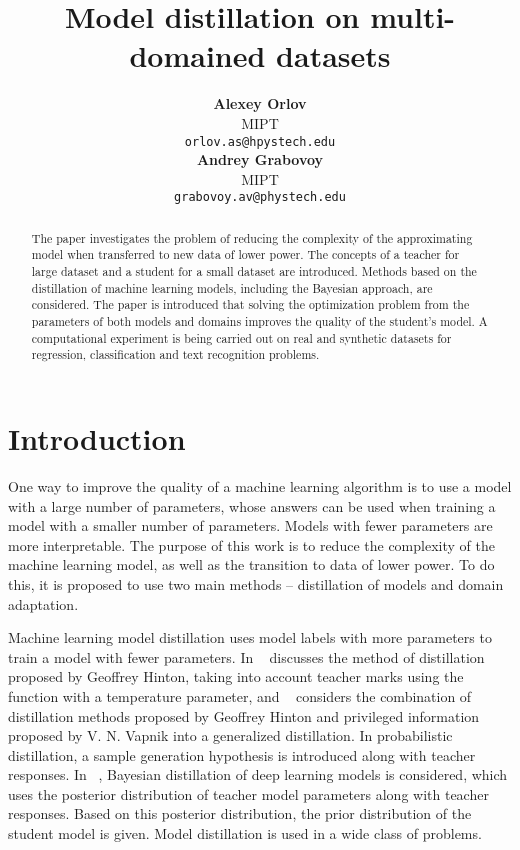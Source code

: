 \documentclass[12pt]{article}
\title{Model distillation on multi-domained datasets}
\author{ \textbf{Alexey Orlov}\\
	MIPT\\
        \texttt{orlov.as@hpystech.edu}\\
	\And
	\textbf{Andrey Grabovoy} \\
	MIPT\\
        \texttt{grabovoy.av@phystech.edu}\\
}
\date{}
\begin{document}
\maketitle

\begin{abstract}
	The paper investigates the problem of reducing the complexity of the approximating model when transferred to new data of lower power. The concepts of a teacher for large dataset and a student for a small dataset are introduced. Methods based on the distillation of machine learning models, including the Bayesian approach, are considered. The paper is introduced that solving the optimization problem from the parameters of both models and domains improves the quality of the student's model. A computational experiment is being carried out on real and synthetic datasets for regression, classification and text recognition problems.
\end{abstract}




\section{Introduction}

One way to improve the quality of a machine learning algorithm is to use a model with a large number of parameters, whose answers can be used when training a model with a smaller number of parameters. Models with fewer parameters are more interpretable. The purpose of this work is to reduce the complexity of the machine learning model, as well as the transition to data of lower power. To do this, it is proposed to use two main methods -- distillation of models and domain adaptation.



Machine learning model distillation uses model labels with more parameters to train a model with fewer parameters. In ~\cite{Hinton2015} discusses the method of distillation proposed by Geoffrey Hinton, taking into account teacher marks using the function  with a temperature parameter, and ~\cite{Vapnik2016} considers the combination of distillation methods proposed by Geoffrey Hinton and privileged information ~\cite{Vapnik2016} proposed by V. N. Vapnik into a generalized distillation. In probabilistic distillation, a sample generation hypothesis is introduced along with teacher responses. In ~\cite{Grabovoy2021}, Bayesian distillation of deep learning models is considered, which uses the posterior distribution of teacher model parameters along with teacher responses. Based on this posterior distribution, the prior distribution of the student model is given. Model distillation is used in a wide class of problems. 
\end{document}
